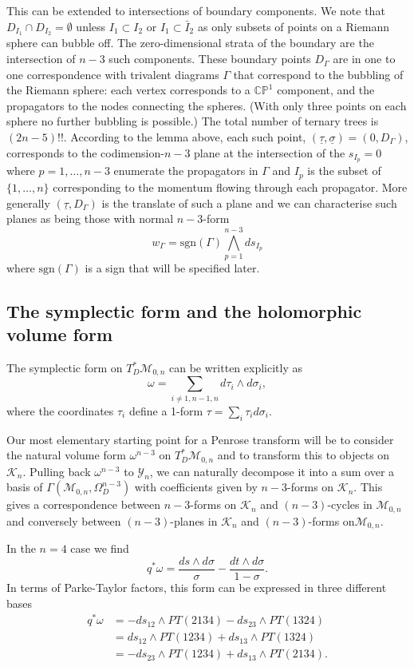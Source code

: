 \documentclass[11pt]{article}
\newcommand{\CP}{\mathbb{CP}}
\newcommand{\cK}{\mathcal{K}}
\newcommand{\cM}{\mathcal{M}}
\newcommand{\cY}{\mathcal{Y}}
\newcommand{\sgn}{\mathrm{sgn}}
\newcommand{\bs}{\underline{\sigma}}
\newcommand{\bt}{\underline{\tau}}
\newcommand{\1}{{\rm 1\hskip-0.25em I}}
\begin{document}
This can be extended to intersections of boundary components.  We note that $D_{I_1}\cap D_{I_2}=\emptyset$ unless $I_1\subset I_2$ or $I_1\subset \bar I_2$ as only subsets of points on a Riemann sphere can bubble off.  The zero-dimensional strata of the boundary are the intersection of $n-3$ such components.  These boundary points $D_\Gamma$ are in one to one correspondence with trivalent diagrams $\Gamma$ that  correspond to the bubbling of the Riemann sphere:  each vertex corresponds to a $\CP^1$ component, and the propagators to the nodes connecting the spheres.  (With only three points on each sphere no further bubbling is possible.) The total number of ternary trees is $(2n-5)!!$. According to the lemma above, each such point, $(\bt,\bs)=(0,D_\Gamma)$, corresponds to the codimension-$n-3$ plane at the intersection of the $s_{I_p}=0$ where $p=1,\ldots , n-3$ enumerate the propagators in $\Gamma$ and $I_p$ is the subset of $\{1, \ldots ,n\}$ corresponding to the momentum flowing through each propagator.  More generally $(\bt, D_\Gamma)$ is the translate of such a plane and we can characterise such planes as being those with normal $n-3$-form
 \begin{equation}
 w_\Gamma= \sgn(\Gamma)\bigwedge_{p=1}^{n-3} d s_{I_p}
 \end{equation}
 where $\sgn(\Gamma)$ is a sign that will be specified later.






\subsection{The symplectic form and the holomorphic volume form}
The symplectic form on $T^*_D\cM_{0,n}$ can be written explicitly as
$$
\omega = \sum_{i\neq 1,n-1,n} d\tau_i \wedge d\sigma_i,
$$
where the coordinates $\tau_i$ define a 1-form $\tau = \sum_i \tau_id\sigma_i$. 


Our most elementary starting point for a Penrose transform will be to consider the natural volume form $\omega^{n-3}$ on $T^*_D\cM_{0,n}$ and to transform this to objects on $\cK_n$. Pulling back $\omega^{n-3}$ to $\cY_n$, we can  naturally decompose it into a sum over  a basis of $\Gamma(\cM_{0,n},\Omega^{n-3}_D)$ with coefficients given by $n-3$-forms on $\cK_n$.  This gives a correspondence between $n-3$-forms on $\cK_n$ and $(n-3)$-cycles in $\cM_{0,n}$ and conversely between $(n-3)$-planes in $\cK_n$ and $(n-3)$-forms on$\cM_{0,n}$.


In the $n=4$  case we find
$$
q^*\omega = \frac{ds\wedge d\sigma}{\sigma} - \frac{dt\wedge d\sigma}{1-\sigma}.
$$
In terms of Parke-Taylor factors, this form can be expressed in three  different bases
\begin{align}
q^* \omega & = -ds_{12} \wedge PT(2134) - ds_{23} \wedge PT(1324) \nonumber\\
& = ds_{12}\wedge PT(1234) + ds_{13}\wedge PT(1324)\nonumber\\
& = -ds_{23}\wedge PT(1234) + ds_{13}\wedge PT(2134).
\end{align}
\end{document}
